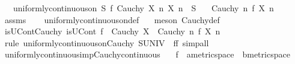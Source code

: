 \begin{isabellebody}
\ \ \ {\isachardoublequoteopen}uniformly{\isacharunderscore}{\kern0pt}continuous{\isacharunderscore}{\kern0pt}on\ S\ f{\isachardoublequoteclose}\ {\isachardoublequoteopen}Cauchy\ X{\isachardoublequoteclose}\ {\isachardoublequoteopen}{\isasymAnd}n{\isachardot}{\kern0pt}\ X\ n\ {\isasymin}\ S{\isachardoublequoteclose}\isanewline
\ \ \ {\isachardoublequoteopen}Cauchy\ {\isacharparenleft}{\kern0pt}{\isasymlambda}n{\isachardot}{\kern0pt}\ f\ {\isacharparenleft}{\kern0pt}X\ n{\isacharparenright}{\kern0pt}{\isacharparenright}{\kern0pt}{\isachardoublequoteclose}\isanewline
%
\isadelimproof
\ \ %
\endisadelimproof
%
\isatagproof
{}\isamarkupfalse%
\ assms\isanewline
\ \ \isamarkupfalse%
\ uniformly{\isacharunderscore}{\kern0pt}continuous{\isacharunderscore}{\kern0pt}on{\isacharunderscore}{\kern0pt}def\ \ \isamarkupfalse%
\ {\isacharparenleft}{\kern0pt}meson\ Cauchy{\isacharunderscore}{\kern0pt}def{\isacharparenright}{\kern0pt}%
\endisatagproof
{\isafoldproof}%
%
\isadelimproof
\isanewline
%
\endisadelimproof
\isanewline
{}\isamarkupfalse%
\ isUCont{\isacharunderscore}{\kern0pt}Cauchy{\isacharcolon}{\kern0pt}\ {\isachardoublequoteopen}isUCont\ f\ {\isasymLongrightarrow}\ Cauchy\ X\ {\isasymLongrightarrow}\ Cauchy\ {\isacharparenleft}{\kern0pt}{\isasymlambda}n{\isachardot}{\kern0pt}\ f\ {\isacharparenleft}{\kern0pt}X\ n{\isacharparenright}{\kern0pt}{\isacharparenright}{\kern0pt}{\isachardoublequoteclose}\isanewline
%
\isadelimproof
\ \ %
\endisadelimproof
%
\isatagproof
{}\isamarkupfalse%
\ {\isacharparenleft}{\kern0pt}rule\ uniformly{\isacharunderscore}{\kern0pt}continuous{\isacharunderscore}{\kern0pt}on{\isacharunderscore}{\kern0pt}Cauchy{\isacharbrackleft}{\kern0pt}\ S{\isacharequal}{\kern0pt}UNIV\ \ f{\isacharequal}{\kern0pt}f{\isacharbrackright}{\kern0pt}{\isacharparenright}{\kern0pt}\ simp{\isacharunderscore}{\kern0pt}all%
\endisatagproof
{\isafoldproof}%
%
\isadelimproof
\isanewline
%
\endisadelimproof
\isanewline
{}\isamarkupfalse%
\ uniformly{\isacharunderscore}{\kern0pt}continuous{\isacharunderscore}{\kern0pt}imp{\isacharunderscore}{\kern0pt}Cauchy{\isacharunderscore}{\kern0pt}continuous{\isacharcolon}{\kern0pt}\isanewline
\ \ \ f\ {\isacharcolon}{\kern0pt}{\isacharcolon}{\kern0pt}\ {\isachardoublequoteopen}{\isacharprime}{\kern0pt}a{\isacharcolon}{\kern0pt}{\isacharcolon}{\kern0pt}metric{\isacharunderscore}{\kern0pt}space\ {\isasymRightarrow}\ {\isacharprime}{\kern0pt}b{\isacharcolon}{\kern0pt}{\isacharcolon}{\kern0pt}metric{\isacharunderscore}{\kern0pt}space{\isachardoublequoteclose}\isanewline

\end{isabellebody}
